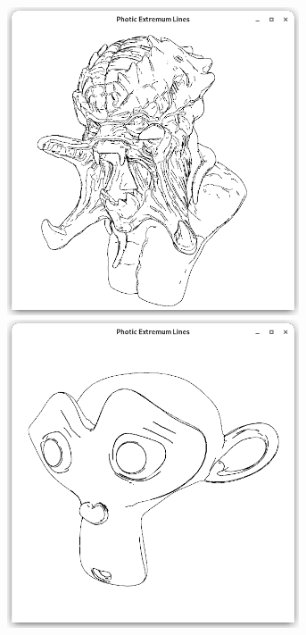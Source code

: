 \documentclass[9pt,fleqn,twoside,twocolumn]{stdglobal}
\begin{document}
\begin{figure}
\begin{subfigure}[t]{0.19\textwidth}
        \includegraphics[width=0.95\textwidth,trim={15px 15 15 50},clip]{images/results/predator-contours-pel.png}
        \includegraphics[width=0.95\textwidth,trim={15px 15 15 50},clip]{images/results/suzanne-contours-pel.png}

\end{subfigure}
\end{figure}
\end{document}
